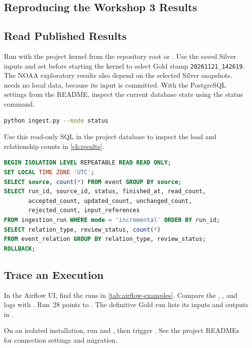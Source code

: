 \documentclass[a4paper,11pt,oneside]{book}
\newcommand{\goldstamp}{\texttt{20261121\_142619}}
\begin{document}
\begin{appendices}
\chapter{Reproducing the Workshop 3 Results}
\label{app:reproduce}
\section{Read Published Results}
Run  with the project kernel from the repository root or . Use the saved Silver inputs and set  before starting the kernel to select Gold stamp \goldstamp. The NOAA exploratory results also depend on the selected Silver snapshots.  needs no local data, because its input is committed. With the PostgreSQL settings from the README, inspect the current database state using the status command.

\begin{lstlisting}[language=bash,numbers=none]
python ingest.py --mode status
\end{lstlisting}

Use this read-only SQL in the project database to inspect the load and relationship counts in \cref{ch:results}.

\begin{lstlisting}[language=SQL,numbers=none]
BEGIN ISOLATION LEVEL REPEATABLE READ READ ONLY;
SET LOCAL TIME ZONE 'UTC';
SELECT source, count(*) FROM event GROUP BY source;
SELECT run_id, source_id, status, finished_at, read_count,
       accepted_count, updated_count, unchanged_count,
       rejected_count, input_references
FROM ingestion_run WHERE mode = 'incremental' ORDER BY run_id;
SELECT relation_type, review_status, count(*)
FROM event_relation GROUP BY relation_type, review_status;
ROLLBACK;
\end{lstlisting}

\section{Trace an Execution}
In the Airflow UI, find the runs in \cref{tab:airflow-examples}. Compare the , ,  and  logs with . Run~28 points to . The definitive Gold run lists its inputs and outputs in .

On an isolated installation, run  and , then trigger . See the project READMEs for connection settings and migration.


\end{appendices}
\end{document}
